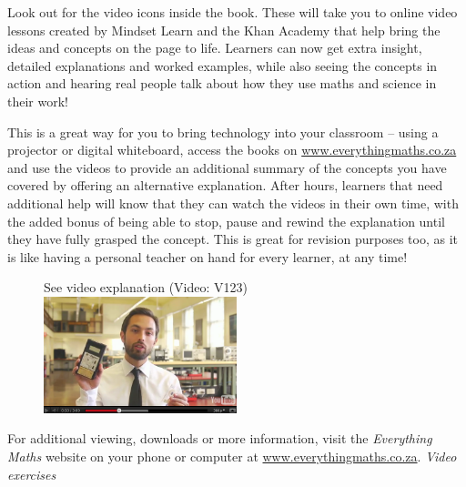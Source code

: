 {\Large

Look out for the video icons inside the book. These will take you to online video lessons created by Mindset
Learn and the Khan Academy that help bring the ideas and concepts on the page to life. Learners can now get extra insight, detailed
explanations and worked examples, while also seeing the concepts in action and hearing real people talk about how they use maths and science in their work!  \par

This is a great way for you to bring technology into your classroom – using a projector or digital whiteboard, access the books on \underline{www.everythingmaths.co.za} and use the videos to provide an additional summary of the concepts you have covered by offering an alternative explanation. After hours, learners that need additional help will know that they can watch the videos in their own time, with the added bonus of being able to stop, pause and rewind the explanation until they have fully grasped the concept. This is great for revision purposes too, as it is like having a personal teacher on hand for every learner, at any time! \par
\begin{figure}[h]
\begin{center}
See video explanation  (Video: V123)\\
\includegraphics[width=0.5\textwidth]{../title_images/veritasiumvideo.png}
\end{center}
\end{figure}

}
For additional viewing, downloads or more information, visit the \textit{Everything Maths} website on your phone or computer at \underline{www.everythingmaths.co.za}.
\vspace{0.5cm}
{\normalfont\sffamily\fontsize{22}\normalfont\itshape Video exercises} \par

